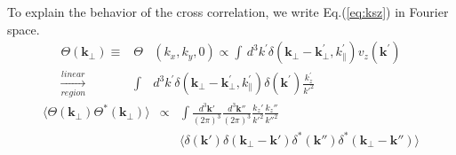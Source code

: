 To explain the behavior of the cross correlation, we write Eq.(\ref{eq:ksz}) in Fourier space. 
\begin{eqnarray}
    \Theta({\bm{k}}_\perp)\equiv&\Theta&({k}_x,{k}_y,0)\propto\int\, 
    d^3k^\prime\delta({\bm{k}}_\perp-\bm{k}_\perp^\prime,k_\parallel^\prime) v_z(\bm{k^\prime})\nonumber\\
    \xrightarrow[region]{linear}&\int& 
d^3k^\prime\delta({\bm{k}}_\perp-\bm{k}_\perp^\prime,k_\parallel^\prime)\delta(\bm{k}^\prime)\frac{k_z^\prime}{k'^2}
    \end{eqnarray}
\begin{eqnarray}
    \langle\Theta({\bm{k}}_\perp)\Theta^{\ast}({\bm{k}}_\perp)\rangle
    &\propto&\int \frac{d^3 \bm{k}'}{(2\pi)^3}\frac{d^3 \bm{k}''}{(2\pi)^3}
    \frac{k_z'}{k'^2}\frac{k_z''}{k''^2}\\
    &&\langle \delta(\bm{k}')\delta({\bm{k}}_\perp-\bm{k}')
    \delta^\ast(\bm{k}'')\delta^\ast({\bm{k}}_\perp-\bm{k}'')\rangle
    \nonumber
\end{eqnarray}

